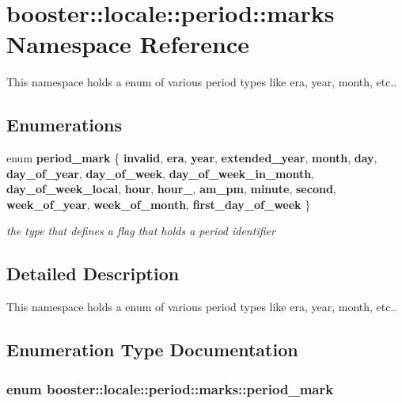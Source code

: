 \section{booster\-:\-:locale\-:\-:period\-:\-:marks \-Namespace \-Reference}
\label{namespacebooster_1_1locale_1_1period_1_1marks}


\-This namespace holds a enum of various period types like era, year, month, etc..  


\subsection*{\-Enumerations}
\begin{DoxyCompactItemize}
\item 
enum {\bf period\-\_\-mark} \{ \*
{\bf invalid}, 
{\bf era}, 
{\bf year}, 
{\bf extended\-\_\-year}, 
\*
{\bf month}, 
{\bf day}, 
{\bf day\-\_\-of\-\_\-year}, 
{\bf day\-\_\-of\-\_\-week}, 
\*
{\bf day\-\_\-of\-\_\-week\-\_\-in\-\_\-month}, 
{\bf day\-\_\-of\-\_\-week\-\_\-local}, 
{\bf hour}, 
{\bf hour\-\_}, 
\*
{\bf am\-\_\-pm}, 
{\bf minute}, 
{\bf second}, 
{\bf week\-\_\-of\-\_\-year}, 
\*
{\bf week\-\_\-of\-\_\-month}, 
{\bf first\-\_\-day\-\_\-of\-\_\-week}
 \}
\begin{DoxyCompactList}\small\item\em the type that defines a flag that holds a period identifier \end{DoxyCompactList}\end{DoxyCompactItemize}


\subsection{\-Detailed \-Description}
\-This namespace holds a enum of various period types like era, year, month, etc.. 

\subsection{\-Enumeration \-Type \-Documentation}
\subsubsection[{period\-\_\-mark}]{\setlength{\rightskip}{0pt plus 5cm}enum {\bf booster\-::locale\-::period\-::marks\-::period\-\_\-mark}}\label{namespacebooster_1_1locale_1_1period_1_1marks_a088e16937a13070e5545d25feaca4a65}


